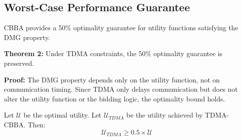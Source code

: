 \subsection{Worst-Case Performance Guarantee}

CBBA provides a 50\% optimality guarantee for utility functions satisfying the DMG property.

\textbf{Theorem 2:} Under TDMA constraints, the 50\% optimality guarantee is preserved.

\textbf{Proof:}
The DMG property depends only on the utility function, not on communication timing. Since TDMA only delays communication but does not alter the utility function or the bidding logic, the optimality bound holds.

Let $\mathcal{U}$ be the optimal utility.
Let $\mathcal{U}_{TDMA}$ be the utility achieved by TDMA-CBBA.
Then:
\[
\mathcal{U}_{TDMA} \geq 0.5 \times \mathcal{U}
\]
